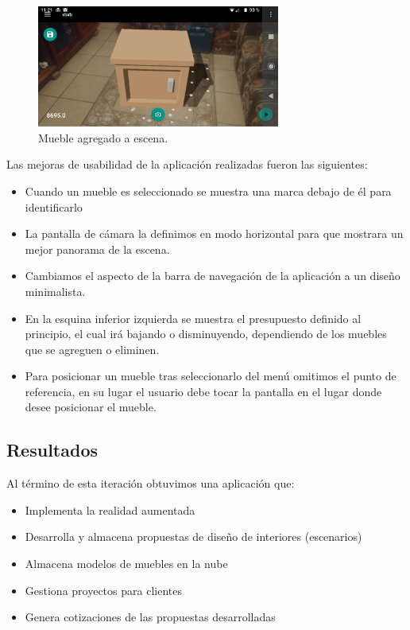 \begin{figure}[h!]
	\centering
	\includegraphics[width=8cm,height=4cm]{imagenes/desarrollo/app/muebleescena.png}
	\caption{Mueble agregado a escena.}
	\label{fig:appfurn}
\end{figure}


Las mejoras de usabilidad de la aplicación realizadas fueron las siguientes:
\begin{itemize}
	\item Cuando un mueble es seleccionado se muestra una marca debajo de él para identificarlo
	\item La pantalla de cámara la definimos en modo horizontal para que mostrara un mejor panorama de la escena.
	\item Cambiamos el aspecto de la barra de navegación de la aplicación a un diseño minimalista.
	\item En la esquina inferior izquierda se muestra el presupuesto definido al principio, el cual irá bajando o disminuyendo, dependiendo de los muebles que se agreguen o eliminen.
	\item Para posicionar un mueble tras seleccionarlo del menú omitimos el punto de referencia, en su lugar el usuario debe tocar la pantalla en el lugar donde desee posicionar el mueble.
\end{itemize}

\subsection{Resultados}
Al término de esta iteración obtuvimos una aplicación que:
\begin{itemize}
	\item Implementa la realidad aumentada
	\item Desarrolla y almacena propuestas de diseño de interiores (escenarios)
	\item Almacena modelos de muebles en la nube
	\item Gestiona proyectos para clientes
	\item Genera cotizaciones de las propuestas desarrolladas
\end{itemize}

